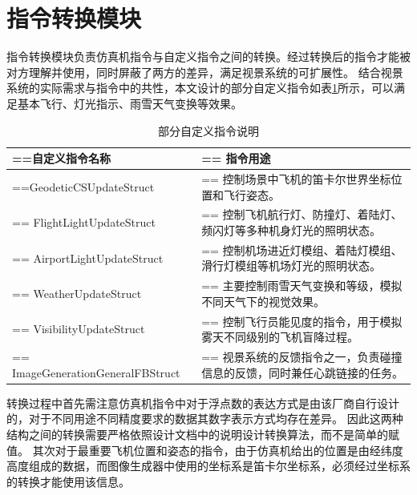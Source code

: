 \section{指令转换模块}
指令转换模块负责仿真机指令与自定义指令之间的转换。经过转换后的指令才能被对方理解并使用，同时屏蔽了两方的差异，满足视景系统的可扩展性。
结合视景系统的实际需求与指令中的共性，本文设计的部分自定义指令如表\ref{selfcommand}所示，可以满足基本飞行、灯光指示、雨雪天气变换等效果。
\begin{table}[h!]
    \begin{center}
        \caption{部分自定义指令说明}
        \label{selfcommand}
        \renewcommand\arraystretch{1.2}
        \begin{tabularx}{\textwidth}{ 
            | >{\centering\arraybackslash\hsize=\hsize\linewidth=\hsize}X 
            | >{\raggedright\arraybackslash\hsize=\hsize\linewidth=\hsize}X 
            | }
            \hline
            \textbf{自定义指令名称} & \textbf{指令用途} \\
            \hline
            GeodeticCSUpdateStruct & 控制场景中飞机的笛卡尔世界坐标位置和飞行姿态。\\
            \hline
            FlightLightUpdateStruct &  控制飞机航行灯、防撞灯、着陆灯、频闪灯等多种机身灯光的照明状态。\\
            \hline
            AirportLightUpdateStruct & 控制机场进近灯模组、着陆灯模组、滑行灯模组等机场灯光的照明状态。\\
            \hline
            WeatherUpdateStruct & 主要控制雨雪天气变换和等级，模拟不同天气下的视觉效果。\\
            \hline
            VisibilityUpdateStruct & 控制飞行员能见度的指令，用于模拟雾天不同级别的飞机盲降过程。\\
            \hline
            ImageGenerationGeneralFBStruct & 视景系统的反馈指令之一，负责碰撞信息的反馈，同时兼任心跳链接的任务。\\
            \hline
        \end{tabularx}
    \end{center}
\end{table}
\par
转换过程中首先需注意仿真机指令中对于浮点数的表达方式是由该厂商自行设计的，对于不同用途不同精度要求的数据其数字表示方式均存在差异。
因此这两种结构之间的转换需要严格依照设计文档中的说明设计转换算法，而不是简单的赋值。
其次对于最重要飞机位置和姿态的指令，由于仿真机给出的位置是由经纬度高度组成的数据，而图像生成器中使用的坐标系是笛卡尔坐标系，必须经过坐标系的转换才能使用该信息。

